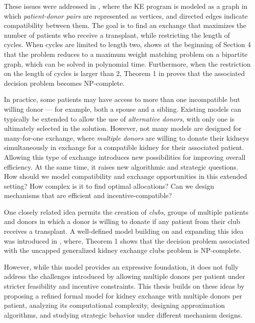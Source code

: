 These issues were addressed in \cite{abraham2007clearing}, where the \ac{KE} program is modeled as a graph in which \textit{patient-donor pairs} are represented as vertices, and directed edges indicate compatibility between them. The goal is to find an exchange that maximizes the number of patients who receive a transplant, while restricting the length of cycles. When cycles are limited to length two, \cite{abraham2007clearing} shows at the beginning of Section 4 that the problem reduces to a maximum weight matching problem on a bipartite graph, which can be solved in polynomial time. Furthermore, when the restriction on the length of cycles is larger than 2, Theorem 1 in \cite{abraham2007clearing} proves that the associated decision problem becomes NP-complete.

In practice, some patients may have access to more than one incompatible but willing donor — for example, both a spouse and a sibling. Existing models can typically be extended to allow the use of \textit{alternative donors}, with only one is ultimately selected in the solution. However, not many models are designed for many-for-one exchange, where \textit{multiple donors} are willing to donate their kidneys simultaneously in exchange for a compatible kidney for their associated patient. Allowing this type of exchange introduces new possibilities for improving overall efficiency. At the same time, it raises new algorithmic and strategic questions. How should we model compatibility and exchange opportunities in this extended setting? How complex is it to find optimal allocations? Can we design mechanisms that are efficient and incentive-compatible?

One closely related idea permits the creation of \textit{clubs}, groups of multiple patients and donors in which a donor is willing to donate if any patient from their club receives a transplant. A well-defined model building on and expanding this idea was introduced in \cite{farina2017operation}, where, Theorem 1 shows that the decision problem associated with the uncapped generalized kidney exchange clubs problem is NP-complete.

However, while this model provides an expressive foundation, it does not fully address the challenges introduced by allowing multiple donors per patient under stricter feasibility and incentive constraints. This thesis builds on these ideas by proposing a refined formal model for kidney exchange with multiple donors per patient, analyzing its computational complexity, designing approximation algorithms, and studying strategic behavior under different mechanism designs.


